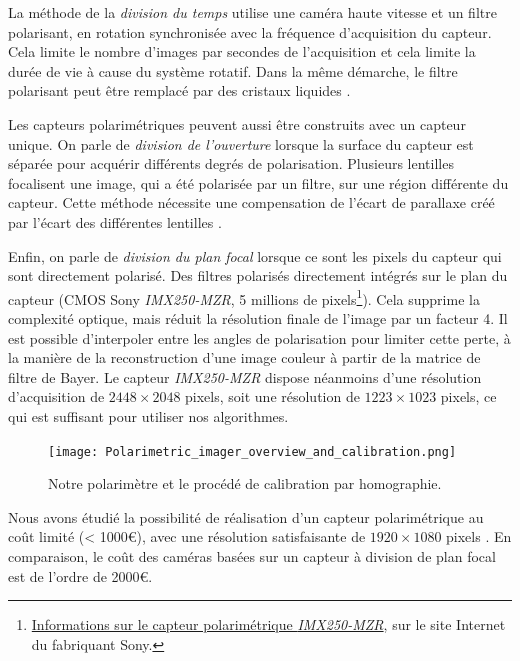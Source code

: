 La méthode de la \textit{division du temps} utilise une caméra haute vitesse et un filtre polarisant, en rotation synchronisée avec la fréquence d'acquisition du capteur.
Cela limite le nombre d'images par secondes de l'acquisition et cela limite la durée de vie à cause du système rotatif.
Dans la même démarche, le filtre polarisant peut être remplacé par des cristaux liquides \cite{gendre_full_2011}.

Les capteurs polarimétriques peuvent aussi être construits avec un capteur unique.
On parle de \textit{division de l'ouverture} lorsque la surface du capteur est séparée pour acquérir différents degrés de polarisation.
Plusieurs lentilles focalisent une image, qui a été polarisée par un filtre, sur une région différente du capteur.
Cette méthode nécessite une compensation de l'écart de parallaxe créé par l'écart des différentes lentilles \cite{riou_calibration_2015}.  %

Enfin, on parle de \textit{division du plan focal} lorsque ce sont les pixels du capteur qui sont directement polarisé.
Des filtres polarisés directement intégrés sur le plan du capteur \cite{yamazaki_fourdirectional_2016} (CMOS Sony \textit{IMX250-MZR}, 5 millions de pixels\footnote{\href{https://www.sony-semicon.co.jp/products_en/IS/sensor5/index.html}{Informations sur le capteur polarimétrique \textit{IMX250-MZR}}, sur le site Internet du fabriquant Sony.}).
Cela supprime la complexité optique, mais réduit la résolution finale de l'image par un facteur 4.
Il est possible d'interpoler entre les angles de polarisation pour limiter cette perte, à la manière de la reconstruction d'une image couleur à partir de la matrice de filtre de Bayer.
Le capteur \textit{IMX250-MZR} dispose néanmoins d'une résolution d'acquisition de $2448\times 2048$ pixels, soit une résolution  de $1223\times 1023$ pixels, ce qui est suffisant pour utiliser nos algorithmes.


\begin{figure}[tbhp]
	\centering
	\texttt{[image: Polarimetric\_imager\_overview\_and\_calibration.png]}
	\caption{Notre polarimètre et le procédé de calibration par homographie.}
	\label{fig:sensor}
\end{figure}

Nous avons étudié la possibilité de réalisation d'un capteur polarimétrique au coût limité (< 1000€), avec une résolution satisfaisante de $1920\times 1080$ pixels \cite{nagorny_polarimetric_2019}.
En comparaison, le coût des caméras basées sur un capteur à division de plan focal est de l'ordre de 2000€.

